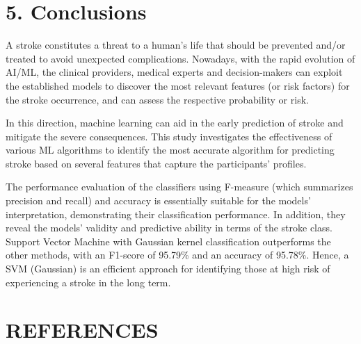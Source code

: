 \documentclass[a4paper]{report}
\begin{document}
	\chapter*{\huge 5. Conclusions}
	A stroke constitutes a threat to a human’s life that should be prevented and/or treated to avoid unexpected complications. Nowadays, with the rapid evolution of AI/ML, the clinical providers, medical experts and decision-makers can exploit the established models to discover the most relevant features (or risk factors) for the stroke occurrence, and can assess the respective probability or risk.
	
	In this direction, machine learning can aid in the early prediction of stroke and mitigate the severe consequences. This study investigates the effectiveness of various ML algorithms to identify the most accurate algorithm for predicting stroke based on several features that capture the participants’ profiles.
	
	The performance evaluation of the classifiers using F-measure (which summarizes precision and recall) and accuracy is essentially suitable for the models’ interpretation, demonstrating their classification performance. In addition, they reveal the models’ validity and predictive ability in terms of the stroke class. Support Vector Machine with Gaussian kernel classification outperforms the other methods, with an F1-score of 95.79\% and an accuracy of 95.78\%. Hence, a SVM (Gaussian) is an efficient approach for identifying those at high risk of experiencing a stroke in the long term.
	
	
	\chapter*{\huge \centering REFERENCES}
	\printbibliography[heading=none]
	\newpage
\end{document}
